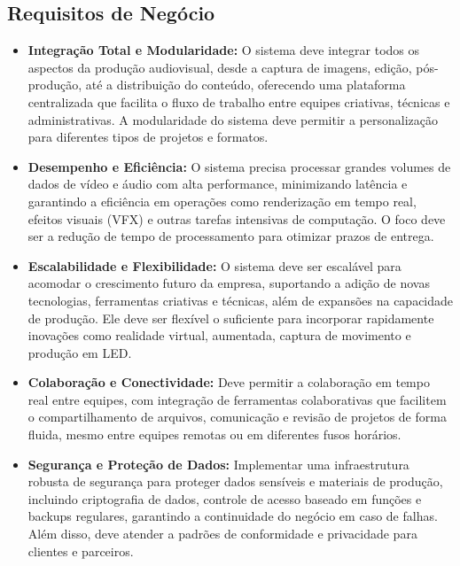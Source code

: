 \subsection{Requisitos de Negócio}

\begin{itemize}
    \item \textbf{Integração Total e Modularidade:} O sistema deve integrar todos os aspectos da produção audiovisual, desde a captura de imagens, edição, pós-produção, até a distribuição do conteúdo, oferecendo uma plataforma centralizada que facilita o fluxo de trabalho entre equipes criativas, técnicas e administrativas. A modularidade do sistema deve permitir a personalização para diferentes tipos de projetos e formatos.
    
    \item \textbf{Desempenho e Eficiência:} O sistema precisa processar grandes volumes de dados de vídeo e áudio com alta performance, minimizando latência e garantindo a eficiência em operações como renderização em tempo real, efeitos visuais (VFX) e outras tarefas intensivas de computação. O foco deve ser a redução de tempo de processamento para otimizar prazos de entrega.
    
    \item \textbf{Escalabilidade e Flexibilidade:} O sistema deve ser escalável para acomodar o crescimento futuro da empresa, suportando a adição de novas tecnologias, ferramentas criativas e técnicas, além de expansões na capacidade de produção. Ele deve ser flexível o suficiente para incorporar rapidamente inovações como realidade virtual, aumentada, captura de movimento e produção em LED.
    
    \item \textbf{Colaboração e Conectividade:} Deve permitir a colaboração em tempo real entre equipes, com integração de ferramentas colaborativas que facilitem o compartilhamento de arquivos, comunicação e revisão de projetos de forma fluida, mesmo entre equipes remotas ou em diferentes fusos horários.
    
    \item \textbf{Segurança e Proteção de Dados:} Implementar uma infraestrutura robusta de segurança para proteger dados sensíveis e materiais de produção, incluindo criptografia de dados, controle de acesso baseado em funções e backups regulares, garantindo a continuidade do negócio em caso de falhas. Além disso, deve atender a padrões de conformidade e privacidade para clientes e parceiros.
\end{itemize}

